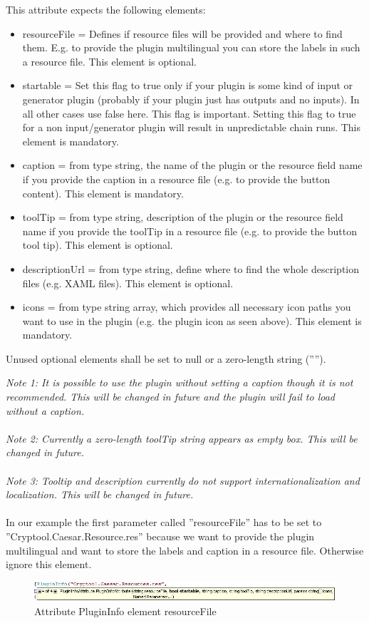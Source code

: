 This attribute expects the following elements:
\begin{itemize}
	\item resourceFile = Defines if resource files will be provided and where to find them. E.g. to provide the plugin multilingual you can store the labels in such a resource file. This element is optional.
	\item startable = Set this flag to true only if your plugin is some kind of input or generator plugin (probably if your plugin just has outputs and no inputs). In all other cases use false here. This flag is important. Setting this flag to true for a non input/generator plugin will result in unpredictable chain runs. This element is mandatory.
	\item caption = from type string, the name of the plugin or the resource field name if you provide the caption in a resource file (e.g. to provide the button content). This element is mandatory.
	\item toolTip = from type string, description of the plugin or the resource field name if you provide the toolTip in a resource file (e.g. to provide the button tool tip). This element is optional.
	\item descriptionUrl = from type string, define where to find the whole description files (e.g. XAML files). This element is optional.
	\item icons = from type string array, which provides all necessary icon paths you want to use in the plugin (e.g. the plugin icon as seen above). This element is mandatory.
\end{itemize}
Unused optional elements shall be set to null or a zero-length string ('''').


\textit{\small Note 1: It is possible to use the plugin without setting a caption though it is not recommended. This will be changed in future and the plugin will fail to load without a caption.\\\\
\small Note 2: Currently a zero-length toolTip string appears as empty box. This will be changed in future.\\\\
\small Note 3: Tooltip and description currently do not support internationalization and localization. This will be changed in future.\\\\}
In our example the first parameter called ''resourceFile'' has to be set to ''Cryptool.Caesar.Resource.res'' because we want to provide the plugin multilingual and want to store the labels and caption in a resource file. Otherwise ignore this element.
\begin{figure}[h]
	\centering
		\includegraphics[width=1.00\textwidth]{figures/attribute_plugininfo_resourceFile.JPG}
	\caption{Attribute PluginInfo element resourceFile}
	\label{fig:attribute_plugininfo_resourceFile}
\end{figure}

